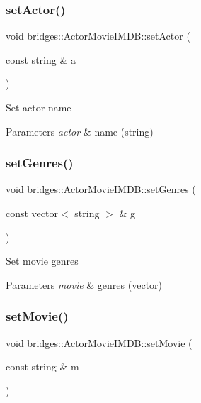 \subsubsection{\texorpdfstring{setActor()}{setActor()}}
{\footnotesize\ttfamily void bridges\+::\+Actor\+Movie\+I\+M\+D\+B\+::set\+Actor (\begin{DoxyParamCaption}\item[{const string \&}]{a }\end{DoxyParamCaption})\hspace{0.3cm}{\ttfamily [inline]}}

Set actor name


\begin{DoxyParams}{Parameters}
{\em actor} & name (string) \\
\hline
\end{DoxyParams}
\mbox{\label{classbridges_1_1_actor_movie_i_m_d_b_acae015a46ec88155ca159974f29ba234}} 
\subsubsection{\texorpdfstring{setGenres()}{setGenres()}}
{\footnotesize\ttfamily void bridges\+::\+Actor\+Movie\+I\+M\+D\+B\+::set\+Genres (\begin{DoxyParamCaption}\item[{const vector$<$ string $>$ \&}]{g }\end{DoxyParamCaption})\hspace{0.3cm}{\ttfamily [inline]}}

Set movie genres


\begin{DoxyParams}{Parameters}
{\em movie} & genres (vector) \\
\hline
\end{DoxyParams}
\mbox{\label{classbridges_1_1_actor_movie_i_m_d_b_ae773ef3fc7ae370d4ab2bc1aeac60a9a}} 
\subsubsection{\texorpdfstring{setMovie()}{setMovie()}}
{\footnotesize\ttfamily void bridges\+::\+Actor\+Movie\+I\+M\+D\+B\+::set\+Movie (\begin{DoxyParamCaption}\item[{const string \&}]{m }\end{DoxyParamCaption})\hspace{0.3cm}{\ttfamily [inline]}}

